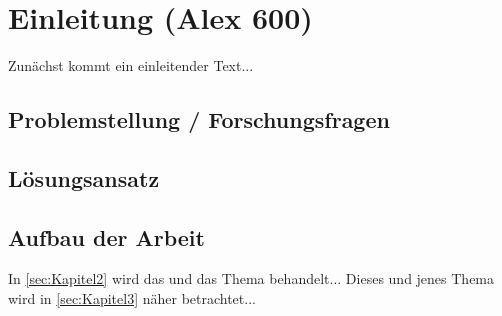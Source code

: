 


\chapter{Einleitung (Alex 600)}
\label{sec:Einleitung} %



Zunächst kommt ein einleitender Text...

\section{Problemstellung / Forschungsfragen}

\section{Lösungsansatz}
\label{sec:loesungsansatz}

\section{Aufbau der Arbeit}
In \autoref{sec:Kapitel2} wird das und das Thema  behandelt...
Dieses und jenes Thema wird in \autoref{sec:Kapitel3} näher betrachtet...

\blindtext



 